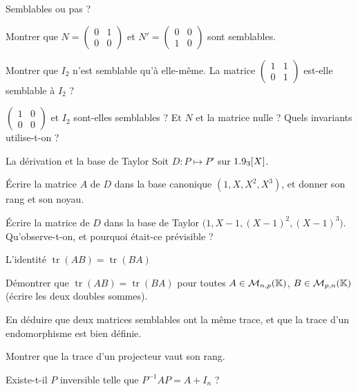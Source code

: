 \begin{exercice}[2]{Semblables ou pas ?}
\begin{questions}
  \item Montrer que $N=\begin{pmatrix}0&1\\0&0\end{pmatrix}$ et
    $N'=\begin{pmatrix}0&0\\1&0\end{pmatrix}$ sont semblables.
  \item Montrer que $I_2$ n'est semblable qu'à elle-même. La matrice
    $\begin{pmatrix}1&1\\0&1\end{pmatrix}$ est-elle semblable à $I_2$ ?
  \item $\begin{pmatrix}1&0\\0&0\end{pmatrix}$ et $I_2$ sont-elles
    semblables ? Et $N$ et la matrice nulle ? Quels invariants utilise-t-on ?
\end{questions}
\end{exercice}

\begin{exercice}[2]{La dérivation et la base de Taylor}
Soit $D:P\mapsto P'$ sur $1.9_3[X]$.
\begin{questions}
  \item Écrire la matrice $A$ de $D$ dans la base canonique
    $(1,X,X^{2},X^{3})$, et donner son rang et son noyau.
  \item Écrire la matrice de $D$ dans la base de Taylor
    $\bigl(1,X-1,(X-1)^{2},(X-1)^{3}\bigr)$. Qu'observe-t-on, et
    pourquoi était-ce prévisible ?
\end{questions}
\end{exercice}

\begin{exercice}[2]{L'identité $\operatorname{tr}(AB)=\operatorname{tr}(BA)$}
\begin{questions}
  \item Démontrer que $\operatorname{tr}(AB)=\operatorname{tr}(BA)$ pour
    toutes $A\in\mathcal{M}_{n,p}(\mathbb{K})$, $B\in\mathcal{M}_{p,n}(\mathbb{K})$
    (écrire les deux doubles sommes).
  \item En déduire que deux matrices semblables ont la même trace, et que
    la trace d'un endomorphisme est bien définie.
  \item Montrer que la trace d'un projecteur vaut son rang.
  \item Existe-t-il $P$ inversible telle que $P^{-1}AP=A+I_n$ ?
\end{questions}
\end{exercice}

